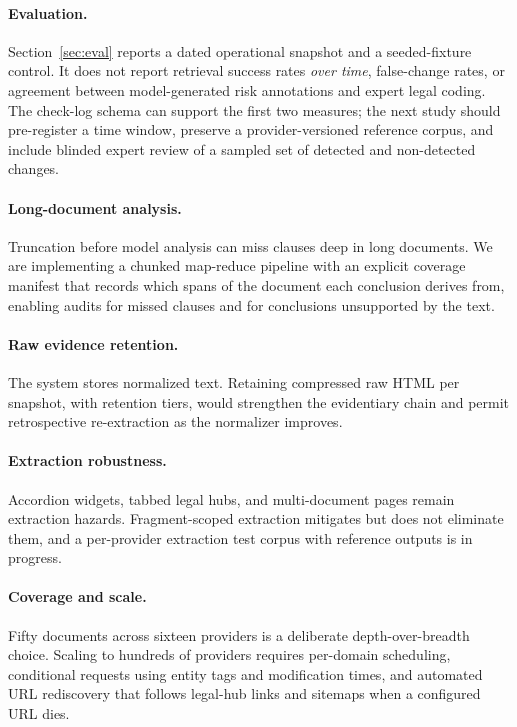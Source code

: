 \documentclass[11pt]{article}
\begin{document}
\paragraph{Evaluation.}
Section~\ref{sec:eval} reports a dated operational snapshot and a seeded-fixture
control. It does not report retrieval success rates \emph{over time},
false-change rates, or agreement between model-generated risk annotations and
expert legal coding. The check-log schema can support the first two measures; the
next study should pre-register a time window, preserve a provider-versioned
reference corpus, and include blinded expert review of a sampled set of detected
and non-detected changes.

\paragraph{Long-document analysis.}
Truncation before model analysis can miss clauses deep in long documents. We are
implementing a chunked map-reduce pipeline with an explicit coverage manifest
that records which spans of the document each conclusion derives from, enabling
audits for missed clauses and for conclusions unsupported by the text.

\paragraph{Raw evidence retention.}
The system stores normalized text. Retaining compressed raw HTML per snapshot,
with retention tiers, would strengthen the evidentiary chain and permit
retrospective re-extraction as the normalizer improves.

\paragraph{Extraction robustness.}
Accordion widgets, tabbed legal hubs, and multi-document pages remain extraction
hazards. Fragment-scoped extraction mitigates but does not eliminate them, and a
per-provider extraction test corpus with reference outputs is in progress.

\paragraph{Coverage and scale.}
Fifty documents across sixteen providers is a deliberate depth-over-breadth
choice. Scaling to hundreds of providers requires per-domain scheduling,
conditional requests using entity tags and modification times, and automated URL
rediscovery that follows legal-hub links and sitemaps when a configured URL dies.
\end{document}
